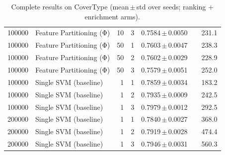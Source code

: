 \begin{table}[ht]
\begin{tabular}{rlrrccr}
100000 & Feature Partitioning (Φ) & 10 & 3 & 0.7584\,$\pm$\,0.0050 &  & 231.1 \\
100000 & Feature Partitioning (Φ) & 50 & 1 & 0.7603\,$\pm$\,0.0047 &  & 238.3 \\
100000 & Feature Partitioning (Φ) & 50 & 2 & 0.7602\,$\pm$\,0.0029 &  & 228.9 \\
100000 & Feature Partitioning (Φ) & 50 & 3 & 0.7579\,$\pm$\,0.0051 &  & 252.0 \\
100000 & Single SVM (baseline) & 1 & 1 & 0.7859\,$\pm$\,0.0034 &  & 183.2 \\
100000 & Single SVM (baseline) & 1 & 2 & 0.7935\,$\pm$\,0.0009 &  & 242.5 \\
100000 & Single SVM (baseline) & 1 & 3 & 0.7979\,$\pm$\,0.0012 &  & 292.5 \\
200000 & Single SVM (baseline) & 1 & 1 & 0.7840\,$\pm$\,0.0027 &  & 368.0 \\
200000 & Single SVM (baseline) & 1 & 2 & 0.7919\,$\pm$\,0.0028 &  & 474.4 \\
200000 & Single SVM (baseline) & 1 & 3 & 0.7946\,$\pm$\,0.0031 &  & 560.3 \\
\bottomrule
\end{tabular}
\caption{Complete results on CoverType (mean\,$\pm$\,std over seeds; ranking + enrichment arms).}
\label{tab:app_covertype}
\end{table}
